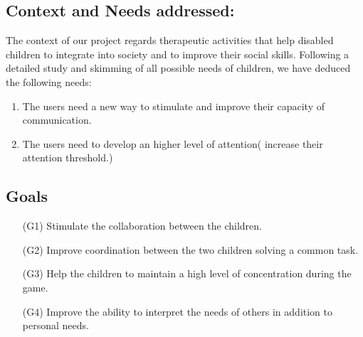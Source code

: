 \documentclass [12pt]{article}
\begin{document}
\subsection{Context and Needs addressed:}
The context of our project regards therapeutic activities that help disabled children to integrate into society and to improve their social skills. Following a detailed study and skimming of all possible needs of children, we have deduced the following needs: 
\begin{enumerate}
\item The users need a new way to stimulate and improve their capacity of communication.
\item The users need to develop an higher level of attention( increase their attention threshold.) 
\end{enumerate}

\subsection{Goals}
\begin{enumerate}
\item[(G1)]Stimulate the collaboration between the children.
\item[(G2)]Improve coordination between the two children solving a common task.
\item[(G3)]Help the children to maintain a high level of concentration during the game.
\item[(G4)]Improve the ability to interpret the needs of others in addition to personal needs.
\end{enumerate}



\clearpage
\end{document}
